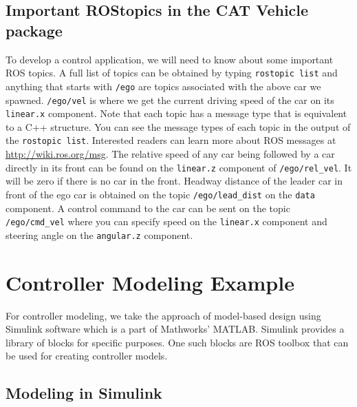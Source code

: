 \documentclass[
]{article}
\begin{document}
\hypertarget{important-rostopics-in-the-cat-vehicle-package}{%
\subsection{Important ROStopics in the CAT Vehicle
package}\label{important-rostopics-in-the-cat-vehicle-package}}

To develop a control application, we will need to know about some
important ROS topics. A full list of topics can be obtained by typing
\texttt{rostopic\ list} and anything that starts with \texttt{/ego} are
topics associated with the above car we spawned. \texttt{/ego/vel} is
where we get the current driving speed of the car on its
\texttt{linear.x} component. Note that each topic has a message type
that is equivalent to a C++ structure. You can see the message types of
each topic in the output of the \texttt{rostopic\ list}. Interested
readers can learn more about ROS messages at
\url{http://wiki.ros.org/msg}. The relative speed of any car being
followed by a car directly in its front can be found on the
\texttt{linear.z} component of \texttt{/ego/rel\_vel}. It will be zero
if there is no car in the front. Headway distance of the leader car in
front of the ego car is obtained on the topic \texttt{/ego/lead\_dist}
on the \texttt{data} component. A control command to the car can be sent
on the topic \texttt{/ego/cmd\_vel} where you can specify speed on the
\texttt{linear.x} component and steering angle on the \texttt{angular.z}
component.

\hypertarget{controller-modeling-example}{%
\section{Controller Modeling
Example}\label{controller-modeling-example}}

\label{sec:example}

For controller modeling, we take the approach of model-based design
using Simulink software which is a part of Mathworks' MATLAB. Simulink
provides a library of blocks for specific purposes. One such blocks are
ROS toolbox that can be used for creating controller models.

\hypertarget{modeling-in-simulink}{%
\subsection{Modeling in Simulink}\label{modeling-in-simulink}}
\end{document}
